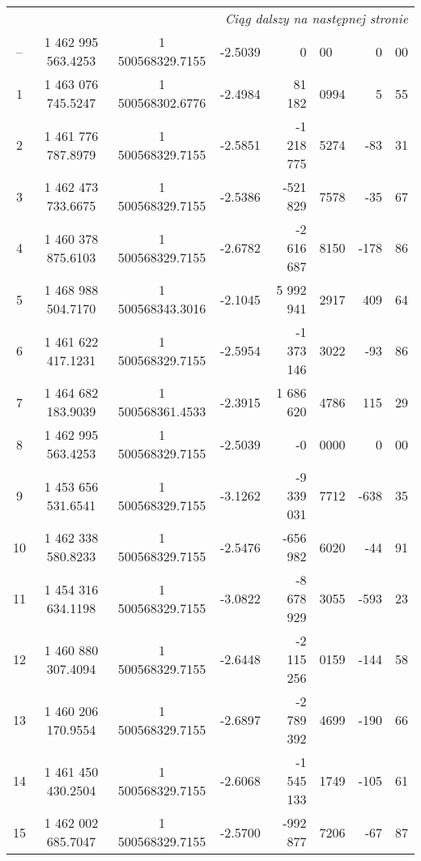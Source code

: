 \begin{center}
\begin{longtable}{|c|c|c|c|r@{.}l|r@{.}l|}
\hline \multicolumn{8}{r}{\textit{Ciąg dalszy na następnej stronie}} \\
\endfoot
\hline
\endlastfoot
--  &     1 462 995 563.4253   &    1 500568329.7155   &      -2.5039  &                0 & 00     &     0 & 00 \\ \hline
1   &     1 463 076 745.5247   &    1 500568302.6776   &      -2.4984  &           81 182 & 0994   &     5 & 55 \\ \hline
2   &     1 461 776 787.8979   &    1 500568329.7155   &      -2.5851  &       -1 218 775 & 5274   &   -83 & 31 \\ \hline
3   &     1 462 473 733.6675   &    1 500568329.7155   &      -2.5386  &         -521 829 & 7578   &   -35 & 67 \\ \hline
4   &     1 460 378 875.6103   &    1 500568329.7155   &      -2.6782  &       -2 616 687 & 8150   &  -178 & 86 \\ \hline
5   &     1 468 988 504.7170   &    1 500568343.3016   &      -2.1045  &        5 992 941 & 2917   &   409 & 64 \\ \hline
6   &     1 461 622 417.1231   &    1 500568329.7155   &      -2.5954  &       -1 373 146 & 3022   &   -93 & 86 \\ \hline
7   &     1 464 682 183.9039   &    1 500568361.4533   &      -2.3915  &        1 686 620 & 4786   &   115 & 29 \\ \hline
8   &     1 462 995 563.4253   &    1 500568329.7155   &      -2.5039  &               -0 & 0000   &     0 & 00 \\ \hline
9   &     1 453 656 531.6541   &    1 500568329.7155   &      -3.1262  &       -9 339 031 & 7712   &  -638 & 35 \\ \hline
10  &     1 462 338 580.8233   &    1 500568329.7155   &      -2.5476  &         -656 982 & 6020   &   -44 & 91 \\ \hline
11  &     1 454 316 634.1198   &    1 500568329.7155   &      -3.0822  &       -8 678 929 & 3055   &  -593 & 23 \\ \hline
12  &     1 460 880 307.4094   &    1 500568329.7155   &      -2.6448  &       -2 115 256 & 0159   &  -144 & 58 \\ \hline
13  &     1 460 206 170.9554   &    1 500568329.7155   &      -2.6897  &       -2 789 392 & 4699   &  -190 & 66 \\ \hline
14  &     1 461 450 430.2504   &    1 500568329.7155   &      -2.6068  &       -1 545 133 & 1749   &  -105 & 61 \\ \hline
15  &     1 462 002 685.7047   &    1 500568329.7155   &      -2.5700  &         -992 877 & 7206   &   -67 & 87 \\ \hline

\end{longtable}
\end{center}
